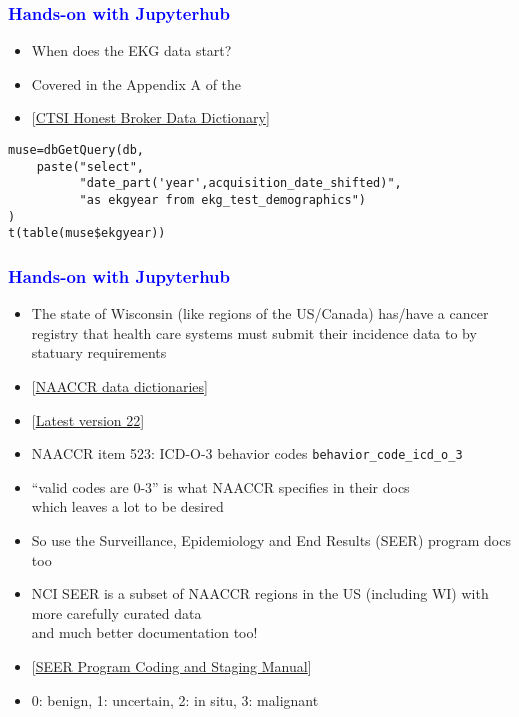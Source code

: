 \documentclass[11pt,pdftex,dvipsnames,usenames]{beamer}
\begin{document}
\begin{frame}[fragile]\frametitle{\bf\textcolor{blue}{Hands-on with Jupyterhub}}
\begin{itemize}
\item When does the EKG data start?
\item Covered in the Appendix A of the 
\item \textcolor{PineGreen}{[\href{https://ctri.mcw.edu/wp-content/uploads/CTSI-Honest-Broker-Data-Dictionary.pdf}{CTSI Honest Broker Data Dictionary}]}
\end{itemize}
\begin{verbatim}
muse=dbGetQuery(db, 
    paste("select",
          "date_part('year',acquisition_date_shifted)",
          "as ekgyear from ekg_test_demographics")
)
t(table(muse$ekgyear))
\end{verbatim}
\end{frame}

\begin{frame}[fragile]\frametitle{\bf\textcolor{blue}{Hands-on with Jupyterhub}}
\begin{itemize}
\item The state of Wisconsin (like regions of the US/Canada) 
has/have a cancer registry that health care systems must
submit their incidence data to by statuary requirements
\item \textcolor{PineGreen}{[\href{https://www.naaccr.org/data-standards-data-dictionary}
{NAACCR data dictionaries}]}
\item 
\textcolor{PineGreen}{[\href{http://datadictionary.naaccr.org/default.aspx?c=10&Version=22}
{Latest version 22}]}
\item NAACCR item 523: ICD-O-3 behavior codes \texttt{behavior\_code\_icd\_o\_3}
\item ``valid codes are 0-3'' is what NAACCR specifies in their docs\\ 
which leaves a lot to be desired
\item So use the Surveillance, Epidemiology
and End Results (SEER) program docs too 
\item NCI SEER is a subset of NAACCR
regions in the US (including WI) with more carefully curated data\\
and much better documentation too!
\item \textcolor{PineGreen}{[\href{https://seer.cancer.gov/manuals/2022/SPCSM_2022_MainDoc.pdf}
{SEER Program Coding and Staging Manual}]}
\item 0: benign, 1: uncertain, 2: in situ, 3: malignant
\end{itemize}
\end{frame}
\end{document}
